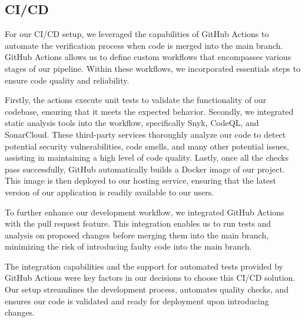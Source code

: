 \subsection{CI/CD} \label{sec:cicd}

For our CI/CD setup, we leveraged the capabilities of GitHub Actions to automate the verification process when code is merged into the main branch. GitHub Actions allows us to define custom workflows that encompasses various stages of our pipeline. Within these workflows, we incorporated essentials steps to ensure code quality and reliability.

Firstly, the actions execute unit tests to validate the functionality of our codebase, ensuring that it meets the expected behavior. Secondly, we integrated static analysis tools into the workflow, specifically Snyk, CodeQL, and SonarCloud. These third-party services thoroughly analyze our code to detect potential security vulnerabilities, code smells, and many other potential issues, assisting in maintaining a high level of code quality. 
Lastly, once all the checks pass successfully, GitHub automatically builds a Docker image of our project. This image is then deployed to our hosting service, ensuring that the latest version of our application is readily available to our users.

To further enhance our development workflow, we integrated GitHub Actions with the pull request feature. This integration enables us to run tests and analysis on proposed changes before merging them into the main branch, minimizing the risk of introducing faulty code into the main branch.

The integration capabilities and the support for automated tests provided by GitHub Actions were key factors in our decisions to choose this CI/CD solution. Our setup streamlines the development process, automates quality checks, and ensures our code is validated and ready for deployment upon introducing changes.

